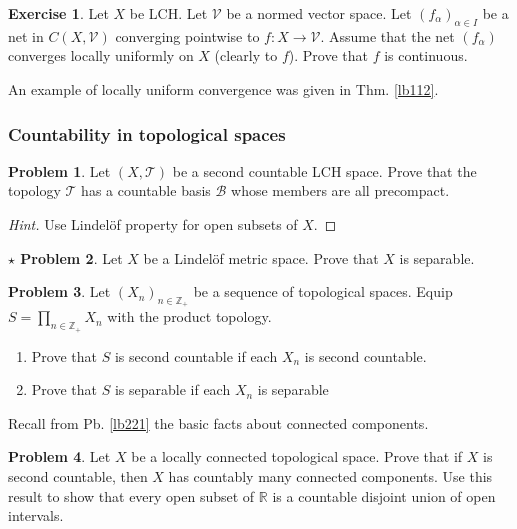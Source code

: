 \documentclass[12pt,b5paper,notitlepage]{article}
\theoremstyle{definition}
\newtheorem{exe}[df]{Exercise}
\newtheorem{prob}{\color{red}Problem}[section]
\newtheorem{sprob}[prob]{\color{red}$\star$ Problem}
\theoremstyle{plain}
\newcommand{\mc}{\mathcal}
\newcommand{\Zbb}{\mathbb Z}
\newcommand{\Rbb}{\mathbb R}
\numberwithin{equation}{section}
\begin{document}
\begin{exe}
Let $X$ be LCH. Let $\mc V$ be a normed vector space. Let $(f_\alpha)_{\alpha\in I}$ be a net in $C(X,\mc V)$ converging pointwise to $f:X\rightarrow 
\mc V$. Assume that the net $(f_\alpha)$ converges locally uniformly on $X$ (clearly to $f$). Prove that $f$ is continuous. 
\end{exe}






An example of locally uniform convergence was given in Thm. \ref{lb112}.



\subsubsection{Countability in topological spaces}



\begin{prob}
Let $(X,\mc T)$ be a second countable LCH space. Prove that the topology $\mc T$ has a countable basis $\mc B$ whose members are all precompact.
\end{prob}

\begin{proof}[Hint]
Use Lindel\"of property for open subsets of $X$.
\end{proof}

\begin{sprob}\label{lb255}
Let $X$ be a Lindel\"of metric space. Prove that $X$ is separable. 
\end{sprob}


\begin{prob}\label{lb305}
Let $(X_n)_{n\in\Zbb_+}$ be a sequence of topological spaces. Equip $S=\prod_{n\in\Zbb_+}X_n$ with the product topology. 
\begin{enumerate}
\item Prove that $S$ is second countable if each $X_n$ is second countable.
\item Prove that $S$ is separable if each $X_n$ is separable
\end{enumerate}
\end{prob}


Recall from Pb. \ref{lb221} the basic facts about connected components.

\begin{prob}
Let $X$ be a locally connected topological space. Prove that if $X$ is second countable, then $X$ has countably many connected components. Use this result to show that every open subset of $\Rbb$ is a countable disjoint union of open intervals.
\end{prob}
\end{document}
